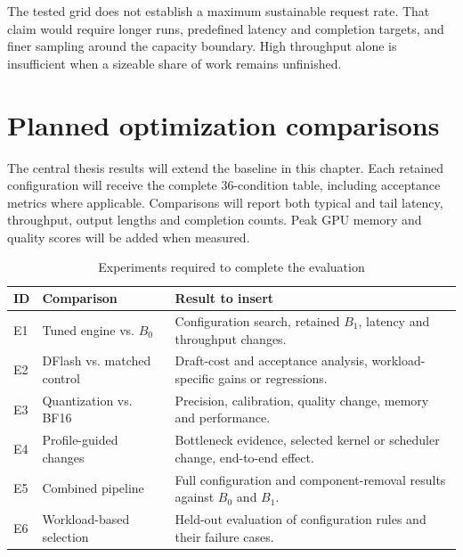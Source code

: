 The tested grid does not establish a maximum sustainable request rate. That claim would require longer runs, predefined latency and completion targets, and finer sampling around the capacity boundary. High throughput alone is insufficient when a sizeable share of work remains unfinished.
\FloatBarrier

\section{Planned optimization comparisons}
The central thesis results will extend the baseline in this chapter. Each retained configuration will receive the complete 36-condition table, including acceptance metrics where applicable. Comparisons will report both typical and tail latency, throughput, output lengths and completion counts. Peak GPU memory and quality scores will be added when measured.

\begin{table}[htbp]
\centering
\caption{Experiments required to complete the evaluation}
\label{tab:pending}
\begin{singlespace}
\small
\begin{tabularx}{\textwidth}{@{}p{1.1cm}p{3.6cm}X@{}}
\toprule
ID & Comparison & Result to insert \\
\midrule
E1 & Tuned engine vs. $B_0$ & Configuration search, retained $B_1$, latency and throughput changes. \\
E2 & DFlash vs. matched control & Draft-cost and acceptance analysis, workload-specific gains or regressions. \\
E3 & Quantization vs. BF16 & Precision, calibration, quality change, memory and performance. \\
E4 & Profile-guided changes & Bottleneck evidence, selected kernel or scheduler change, end-to-end effect. \\
E5 & Combined pipeline & Full configuration and component-removal results against $B_0$ and $B_1$. \\
E6 & Workload-based selection & Held-out evaluation of configuration rules and their failure cases. \\
\bottomrule
\end{tabularx}
\end{singlespace}
\end{table}


